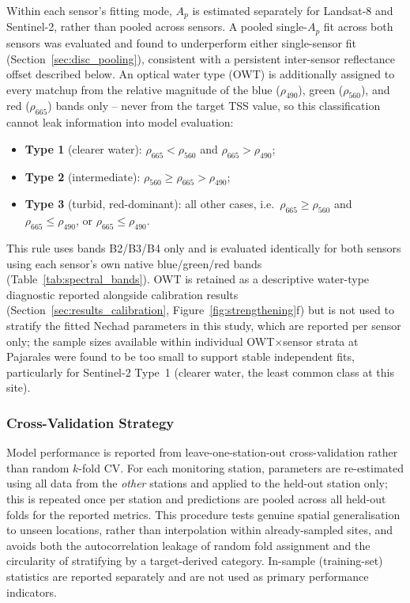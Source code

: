 \documentclass[remotesensing,article,submit,pdftex,moreauthors]{Definitions/mdpi}
\begin{document}
Within each sensor's fitting mode, $A_p$ is estimated separately for
Landsat-8 and Sentinel-2, rather than pooled across sensors. A pooled
single-$A_p$ fit across both sensors was evaluated and found to
underperform either single-sensor fit (Section~\ref{sec:disc_pooling}),
consistent with a persistent inter-sensor reflectance offset described
below. An optical water type (OWT) is additionally assigned to every
matchup from the relative magnitude of the blue ($\rho_{490}$), green
($\rho_{560}$), and red ($\rho_{665}$) bands only -- never from the
target TSS value, so this classification cannot leak information into
model evaluation:
\begin{itemize}
    \item \textbf{Type 1} (clearer water): $\rho_{665} < \rho_{560}$
          and $\rho_{665} > \rho_{490}$;
    \item \textbf{Type 2} (intermediate): $\rho_{560} \geq \rho_{665}
          > \rho_{490}$;
    \item \textbf{Type 3} (turbid, red-dominant): all other cases,
          i.e.\ $\rho_{665} \geq \rho_{560}$ and $\rho_{665} \leq
          \rho_{490}$, or $\rho_{665} \leq \rho_{490}$.
\end{itemize}
This rule uses bands B2/B3/B4 only and is evaluated identically for
both sensors using each sensor's own native blue/green/red bands
(Table~\ref{tab:spectral_bands}). OWT is retained as a descriptive
water-type diagnostic reported alongside calibration results
(Section~\ref{sec:results_calibration}, Figure~\ref{fig:strengthening}f)
but is not used to stratify the fitted Nechad parameters in this study,
which are reported per sensor only; the sample sizes available within
individual OWT$\times$sensor strata at Pajarales were found to be too
small to support stable independent fits, particularly for Sentinel-2
Type~1 (clearer water, the least common class at this site).
 
 
\subsubsection{Cross-Validation Strategy}
\label{sec:cv}
 
Model performance is reported from leave-one-station-out
cross-validation rather than random $k$-fold CV. For each monitoring
station, parameters are re-estimated using all data from the
\emph{other} stations and applied to the held-out station only; this is
repeated once per station and predictions are pooled across all
held-out folds for the reported metrics. This procedure tests genuine
spatial generalisation to unseen locations, rather than interpolation
within already-sampled sites, and avoids both the autocorrelation
leakage of random fold assignment and the circularity of stratifying by
a target-derived category. In-sample (training-set) statistics are
reported separately and are not used as primary performance indicators.
\end{document}
